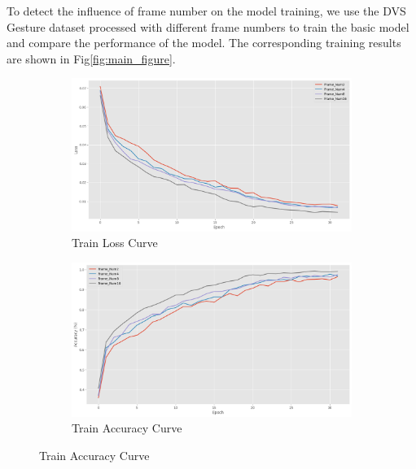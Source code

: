 \documentclass[conference]{IEEEtran}
\begin{document}
To detect the influence of frame number on the model training, we use the DVS Gesture dataset processed with different frame numbers to train the basic model and compare the performance of the model. The corresponding training results are shown in Fig\ref{fig:main_figure}.
\begin{figure}[htbp]
    \centering
    \begin{subfigure}[b]{0.24\textwidth}
        \centering
        \includegraphics[width=\textwidth]{figure/Train_loss.png}
        \caption{Train Loss Curve}
        \label{fig:sub1}
    \end{subfigure}
    \begin{subfigure}[b]{0.24\textwidth}
        \centering
        \includegraphics[width=\textwidth]{figure/Train_acc.png}
        \caption{Train Accuracy Curve}
        \label{fig:sub2}
    \end{subfigure}

    \vspace{0.01em} %


\end{figure}
\end{document}
